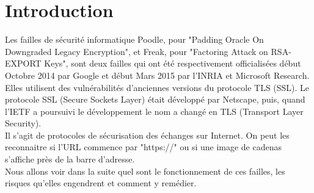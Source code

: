 \section*{Introduction}

Les failles de sécurité informatique Poodle, pour "Padding Oracle On Downgraded Legacy Encryption", et Freak, pour "Factoring Attack on RSA-EXPORT Keys", sont deux failles qui ont été respectivement officialisées début Octobre 2014 par Google et début Mars 2015 par l'INRIA et Microsoft Research. Elles utilisent des vulnérabilités d'anciennes versions du protocole TLS (SSL). Le protocole SSL (Secure Sockets Layer) était développé par Netscape, puis, quand l'IETF a poursuivi le développement le nom a changé en TLS (Transport Layer Security). \\  
Il s'agit de protocoles de sécurisation des échanges sur Internet. On peut les reconnaitre si l'URL commence par "https://" ou si une image de cadenas s'affiche près de la barre d'adresse.\\ 
Nous allons voir dans la suite quel sont le fonctionnement de ces failles, les risques qu'elles engendrent et comment y remédier. 
